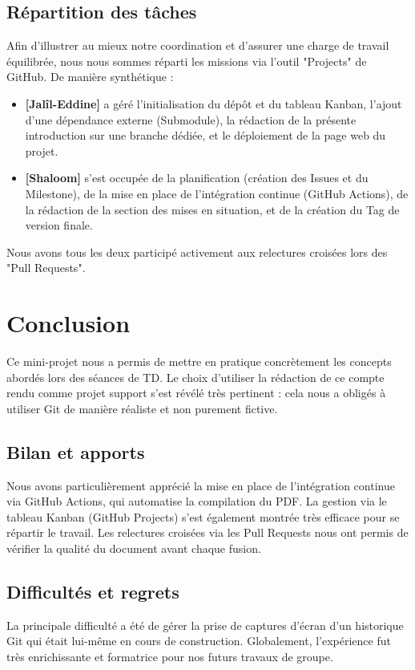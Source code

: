 \documentclass{article}
\begin{document}
\subsection*{Répartition des tâches}
Afin d'illustrer au mieux notre coordination et d'assurer une charge de travail équilibrée, nous nous sommes réparti les missions via l'outil "Projects" de GitHub. 
De manière synthétique :
\begin{itemize}
    \item \textbf{[Jalîl-Eddine]} a géré l'initialisation du dépôt et du tableau Kanban, l'ajout d'une dépendance externe (Submodule), la rédaction de la présente introduction sur une branche dédiée, et le déploiement de la page web du projet.
    \item \textbf{[Shaloom]} s'est occupée de la planification (création des Issues et du Milestone), de la mise en place de l'intégration continue (GitHub Actions), de la rédaction de la section des mises en situation, et de la création du Tag de version finale.
\end{itemize}
Nous avons tous les deux participé activement aux relectures croisées lors des "Pull Requests".

 

\section{Conclusion}
Ce mini-projet nous a permis de mettre en pratique concrètement les concepts abordés lors des séances de TD. Le choix d'utiliser la rédaction de ce compte rendu comme projet support s'est révélé très pertinent : cela nous a obligés à utiliser Git de manière réaliste et non purement fictive.

\subsection*{Bilan et apports}
Nous avons particulièrement apprécié la mise en place de l'intégration continue via GitHub Actions, qui automatise la compilation du PDF. La gestion via le tableau Kanban (GitHub Projects) s'est également montrée très efficace pour se répartir le travail. Les relectures croisées via les Pull Requests nous ont permis de vérifier la qualité du document avant chaque fusion.

\subsection*{Difficultés et regrets}
La principale difficulté a été de gérer la prise de captures d'écran d'un historique Git qui était lui-même en cours de construction. Globalement, l'expérience fut très enrichissante et formatrice pour nos futurs travaux de groupe.
\end{document}
